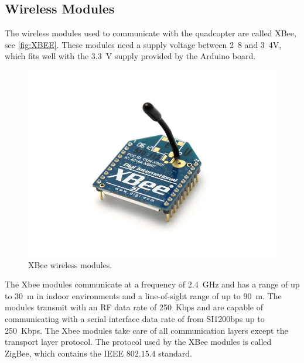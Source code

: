\subsection{Wireless Modules}
The wireless modules used to communicate with the quadcopter are called XBee, see \autoref{fig:XBEE}. These modules need a supply voltage between \si{2.8} and \si{3.4}{V}, which fits well with the \SI{3.3}{V} supply provided by the Arduino board\cite{XBee}.
%
\begin{figure}[H]
  \centering
  \includegraphics[scale=0.25]{figures/XBEE}
  \caption{XBee wireless modules.\cite{XBeeImage}}
  \label{fig:XBEE}
\end{figure}
%
The Xbee modules communicate at a frequency of \SI{2.4}{GHz} and has a range of up to \SI{30}{m} in indoor environments and a line-of-sight range of up to \SI{90}{m}. The modules transmit with an RF data rate of \SI{250}{Kbps} and are capable of communicating with a serial interface data rate of from SI{1200}{bps} up to \SI{250}{Kbps}. The Xbee modules take care of all communication layers except the transport layer protocol. The protocol used by the XBee modules is called ZigBee, which contains the IEEE $802.15.4$ standard.\cite{XBee}
%
